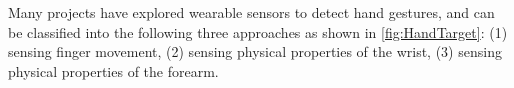 \documentclass{sigchi}
\begin{document}



Many projects have explored wearable sensors to detect hand gestures, and can be classified into the following three approaches as shown in \autoref{fig:HandTarget}: (1) sensing finger movement, (2) sensing physical properties of the wrist, (3) sensing physical properties of the forearm.


\end{document}
